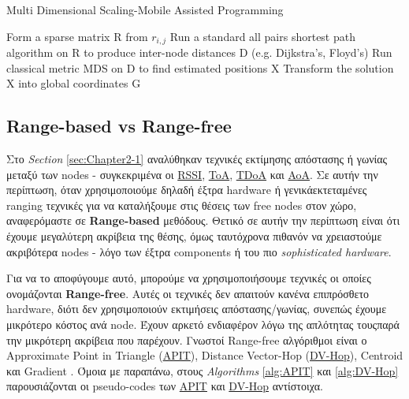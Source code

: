 \begin{algorithm}[H]
	\caption[Multi Dimensional Scaling-Mobile Assisted Programming]{Multi Dimensional Scaling-Mobile Assisted Programming \cite{localization-algorithms}}\label{alg:MDS-MAP}
	\begin{algorithmic}[1]	%
			\State Form a sparse matrix R from $r_{i,j}$
			\State Run a standard all pairs shortest path algorithm on R to produce \newline inter-node distances D (e.g. Dijkstra's, Floyd's)
			\State Run classical metric MDS on D to find estimated positions X
			\State Transform the solution X into global coordinates G
	\end{algorithmic}
\end{algorithm}


\subsection{Range-based vs Range-free}
Στο \emph{Section} \ref{sec:Chapter2-1} αναλύθηκαν τεχνικές εκτίμησης απόστασης ή γωνίας μεταξύ των nodes - συγκεκριμένα οι
\hyperref[abbr:RSSI]{RSSI}, \hyperref[abbr:ToA]{ToA}, \hyperref[abbr:TDoA]{TDoA} και \hyperref[abbr:AoA]{AoA}.
Σε αυτήν την περίπτωση, όταν χρησιμοποιούμε δηλαδή έξτρα hardware ή γενικά\udot εκτεταμένες ranging τεχνικές 
για να καταλήξουμε στις θέσεις των free nodes στον χώρο, αναφερόμαστε σε \textbf{Range-based} μεθόδους.
Θετικό σε αυτήν την περίπτωση είναι ότι έχουμε μεγαλύτερη ακρίβεια της θέσης, όμως ταυτόχρονα 
πιθανόν να χρειαστούμε ακριβότερα nodes - λόγο των έξτρα components ή του πιο \emph{sophisticated hardware}.  

Για να το αποφύγουμε αυτό, μπορούμε να χρησιμοποιήσουμε τεχνικές οι οποίες ονομάζονται \textbf{Range-free}. 
Αυτές οι τεχνικές δεν απαιτούν κανένα επιπρόσθετο hardware, διότι δεν χρησιμοποιούν εκτιμήσεις απόστασης/γωνίας, συνεπώς έχουμε μικρότερο κόστος ανά node. 
Έχουν αρκετό ενδιαφέρον λόγω της απλότητας τους\udot παρά την μικρότερη ακρίβεια που παρέχουν. Γνωστοί Range-free αλγόριθμοι είναι 
ο Approximate Point in Triangle (\hyperref[abbr:APIT]{APIT}), 
Distance Vector-Hop (\hyperref[abbr:DV-Hop]{DV-Hop}), Centroid και Gradient \cite{range-distributed}.
Όμοια με παραπάνω, στους \emph{Algorithms} \ref{alg:APIT} και \ref{alg:DV-Hop} παρουσιάζονται οι pseudo-codes 
των \hyperref[abbr:APIT]{APIT} και \hyperref[abbr:DV-Hop]{DV-Hop} αντίστοιχα.

